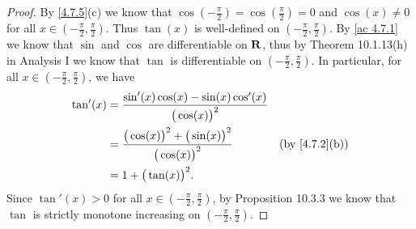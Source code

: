 \begin{proof}
  By \cref{4.7.5}(c) we know that \(\cos(-\frac{\pi}{2}) = \cos(\frac{\pi}{2}) = 0\) and \(\cos(x) \neq 0\) for all \(x \in (-\frac{\pi}{2}, \frac{\pi}{2})\).
  Thus \(\tan(x)\) is well-defined on \((-\frac{\pi}{2}, \frac{\pi}{2})\).
  By \cref{ac 4.7.1} we know that \(\sin\) and \(\cos\) are differentiable on \(\mathbf{R}\), thus by Theorem 10.1.13(h) in Analysis I we know that \(\tan\) is differentiable on \((-\frac{\pi}{2}, \frac{\pi}{2})\).
  In particular, for all \(x \in (-\frac{\pi}{2}, \frac{\pi}{2})\), we have
  \begin{align*}
    \tan'(x) & = \frac{\sin'(x) \cos(x) - \sin(x) \cos'(x)}{\big(\cos(x)\big)^2}                                     \\
             & = \frac{\big(\cos(x)\big)^2 + \big(\sin(x)\big)^2}{\big(\cos(x)\big)^2} & \text{(by \cref{4.7.2}(b))} \\
             & = 1 + \big(\tan(x)\big)^2.
  \end{align*}
  Since \(\tan'(x) > 0\) for all \(x \in (-\frac{\pi}{2}, \frac{\pi}{2})\), by Proposition 10.3.3 we know that \(\tan\) is strictly monotone increasing on \((-\frac{\pi}{2}, \frac{\pi}{2})\).


\end{proof}
